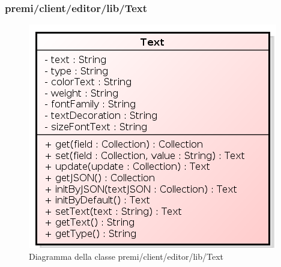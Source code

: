 \subsubsection{premi/client/editor/lib/Text}
\begin{figure}[h]
\begin{center}
\includegraphics[scale=0.40]{img/diacla/text.png}
\caption{Diagramma della classe premi/client/editor/lib/Text}
\end{center}
\end{figure}

